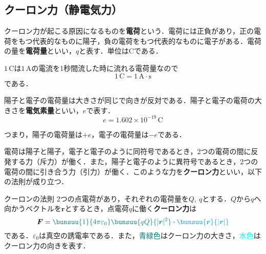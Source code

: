 







\subsection{クーロン力（静電気力）}

クーロン力が起こる原因になるものを\textbf{電荷}という．電荷には正負があり，正の電荷をもつ代表的なものに陽子，負の電荷をもつ代表的なものに電子がある．電荷の量を\textbf{電荷量}といい，$q$と表す．単位は$\mathrm{C}$である．

$1\,\mathrm{C}$は$1\,\mathrm{A}$の電流を1秒間流した時に流れる電荷量なので
\begin{equation}
	1\,\mathrm{C} = 1\,\mathrm{A \cdot s}
\end{equation}
である．

陽子と電子の電荷量は大きさが同じで向きが反対である．陽子と電子の電荷の大きさを\textbf{電気素量}といい，$e$で表す．
\begin{equation}
	e = 1.602 \times 10^{-19}\,\mathrm{C}
\end{equation}

つまり，陽子の電荷量は$+e$，電子の電荷量は$-e$である．

電荷は陽子と陽子，電子と電子のように同符号であるとき，2つの電荷の間に反発する力（斥力）が働く．また，陽子と電子のように異符号であるとき，2つの電荷の間に引き合う力（引力）が働く．このような力を\textbf{クーロン力}といい，以下の法則が成り立つ．

\begin{kousiki}{クーロンの法則}
	2つの点電荷があり，それぞれの電荷量を$Q,\ q$とする．$Q$から$q$へ向かうベクトルを$\bm{r}$とするとき，点電荷$q$に働く\textbf{クーロン力}は
	\begin{equation}
		\bm{F} = {\color{teal}
			\bunsuu{1}{4\pi \varepsilon_0}\bunsuu{qQ}{|\bm{r}|^2}
		}
		\cdot 
		{\color{cyan}
			\bunsuu{\bm{r}}{|\bm{r}|}
		}
	\end{equation}
	である．$\varepsilon_0$は真空の誘電率である．また，\textcolor{teal}{青緑色}はクーロン力の大きさ，\textcolor{cyan}{水色}はクーロン力の向きを表す．
\end{kousiki}



